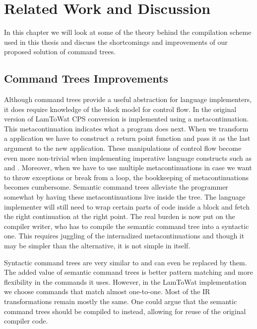 
\chapter{\label{chap:related-work}Related Work and Discussion}

In this chapter we will look at some of the theory behind the compilation scheme used in this thesis and discuss the shortcomings and improvements of our proposed solution of command trees.

\section{\label{section:commandtrees}Command Trees Improvements}
Although command trees provide a useful abstraction for language implementers, it does require knowledge of the block model for control flow. In the original version of LamToWat \ac{CPS} conversion is implemented using a metacontinuation. This metacontinuation indicates what a program does next. When we transform a application we have to construct a return point function and pass it as the last argument to the new application. These manipulations of control flow become even more non-trivial when implementing imperative language constructs such as  and . Moreover, when we have to use multiple metacontinuations in case we want to throw exceptions or break from a  loop, the bookkeeping of metacontinuations becomes cumbersome. Semantic command trees alleviate the programmer somewhat by having these metacontinuations live inside the tree. The language implementer will still need to wrap certain parts of code inside a block and fetch the right continuation at the right point. The real burden is now put on the compiler writer, who has to compile the semantic command tree into a syntactic one. This requires juggling of the internalized metacontinuations and though it may be simpler than the alternative, it is not simple in itself.

Syntactic command trees are very similar to  and can even be replaced by them. The added value of semantic command trees is better pattern matching and more flexibility in the commands it uses. However, in the LamToWat implementation we choose commands that match  almost one-to-one. Most of the \ac{IR} transformations remain mostly the same. One could argue that the semantic command trees should be compiled to  instead, allowing for reuse of the original compiler code.

